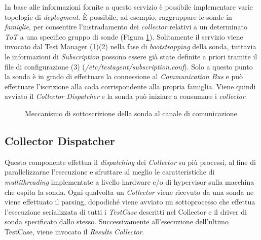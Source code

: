 \documentclass[../main.tex]{subfiles}
\begin{document}
In base alle informazioni fornite a questo servizio è possibile implementare varie topologie di \textit{deployment}.
\`E possibile, ad esempio, raggruppare le sonde in \textit{famiglie}, per consentire l'instradamento dei \textit{collector} relativi a un determinato \textit{ToT} a una specifico gruppo di sonde (Figura \ref{fig:Subscription}).
Solitamente il servizio viene invocato dal Test Manager (1)(2) nella fase di \textit{bootstrapping} della sonda, tuttavia le informazioni di \textit{Subscription} possono essere già state definite a priori tramite il file di configurazione (3) (\textit{/etc/testagent/subscription.conf}).
Solo a questo punto la sonda è in grado di effettuare la connessione al \textit{Communication Bus} e può effettuare l'iscrizione alla coda corrispondente alla propria famiglia.
Viene quindi avviato il \textit{Collector Dispatcher} e la sonda può iniziare a consumare i \textit{collector}.
\begin{figure}[H]
\centering
{}
\caption{Meccanismo di sottoscrizione della sonda al canale di comunicazione}\label{fig:Subscription}
\end{figure}

\subsection {Collector Dispatcher}
Questo componente effettua il \textit{dispatching} dei \textit{Collector} su più processi, al fine di parallelizzarne l'esecuzione e sfruttare al meglio le caratteristiche di \textit{multithreading} implementate a livello hardware e/o di hypervisor sulla macchina che ospita la sonda.
Ogni qualvolta un \textit{Collector} viene ricevuto da una sonda ne viene effettuato il parsing, dopodiché viene avviato un sottoprocesso che effettua l'esecuzione serializzata di tutti i \textit{TestCase} descritti nel Collector e il driver di sonda specificato dallo stesso. Successivamente all'esecuzione dell'ultimo TestCase, viene invocato il \textit{Results Collector}.
\end{document}
